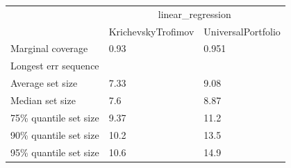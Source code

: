 \begin{tabular}{lll}
\toprule
& \multicolumn{2}{c}{linear_regression} \\
& KrichevskyTrofimov & UniversalPortfolio \\
\midrule
Marginal coverage & 0.93 & 0.951 \\
Longest err sequence &  &  \\
Average set size & 7.33 & 9.08 \\
Median set size & 7.6 & 8.87 \\
75\% quantile set size & 9.37 & 11.2 \\
90\% quantile set size & 10.2 & 13.5 \\
95\% quantile set size & 10.6 & 14.9 \\
\bottomrule
\end{tabular}

